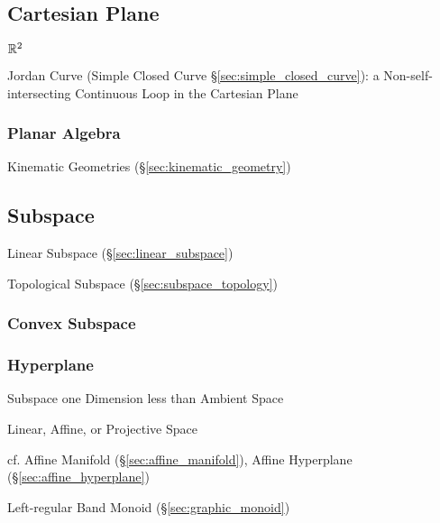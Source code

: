 \subsection{Cartesian Plane}\label{sec:cartesian_plane}

$\mathbb{R}^2$

Jordan Curve (Simple Closed Curve \S\ref{sec:simple_closed_curve}): a
Non-self-intersecting Continuous Loop in the Cartesian Plane



\subsubsection{Planar Algebra}\label{sec:planar_algebra}

Kinematic Geometries (\S\ref{sec:kinematic_geometry})



\subsection{Subspace}\label{sec:subspace}


\fist Linear Subspace (\S\ref{sec:linear_subspace})

\fist Topological Subspace (\S\ref{sec:subspace_topology})



\subsubsection{Convex Subspace}\label{sec:convex_subspace}

\subsubsection{Hyperplane}\label{sec:hyperplane}

Subspace one Dimension less than Ambient Space

Linear, Affine, or Projective Space %

cf. Affine Manifold (\S\ref{sec:affine_manifold}), Affine Hyperplane
(\S\ref{sec:affine_hyperplane})

Left-regular Band Monoid (\S\ref{sec:graphic_monoid})

